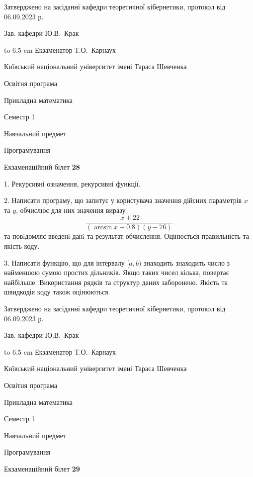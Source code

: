 \documentclass[12pt, ukrainian]{article}
\begin{document}
{\smallskip\smallskip \begin {scriptsize} Затверджено на засіданні кафедри теоретичної кібернетики, протокол   від   06.09.2023 р.\par\smallskip\smallskip\smallskip\smallskip
{\parbox {6.5 cm} {Зав. кафедри \dotfill Ю.В.~Крак}}\hspace {0.7cm} {\hbox to 6.5 cm { Екзаменатор \dotfill Т.О.~Карнаух}} \end{scriptsize}}
\newpage
{{\begin {scriptsize}\par
{ \center  Київський національний університет імені Тараса Шевченка \par}
{\parbox {5 cm}{Освітня програма \hfill}{\parbox {7 cm}{Прикладна математика\hfill}}\parbox {6 cm}{\hfill Семестр 1}}\par
{\parbox {5 cm} {Навчальний предмет \hfill}\parbox {7 cm}{Програмування \hfill}\parbox {6cm}{\hfill}\par}\vspace{-15pt} \end{scriptsize}}{\center Екзаменаційний білет \No \textbf { 28 }\par}}
{%
1. Рекурсивні означення, рекурсивні функції.%
\par
2. Написати програму, що запитує у користувача значення дійсних параметрів $x$ та $y$, обчислює для них значення виразу 
$$\frac{\ x + 22}{(\arcsin x + 0.8) (y - 76)}$$ 
та повiдомляє введенi данi та результат обчислення.
 Оцінюється правильність та якість коду.

\par
3. Написати функцію, що для інтервалу $[a, b)$ знаходить знаходить число з найменшою сумою простих дільників. Якщо таких чисел кілька, повертає найбільше.  Використання рядків та структур даних заборонено. Якість та швидкодія коду також оцінюються. 

}
{\smallskip\smallskip \begin {scriptsize} Затверджено на засіданні кафедри теоретичної кібернетики, протокол   від   06.09.2023 р.\par\smallskip\smallskip\smallskip\smallskip
{\parbox {6.5 cm} {Зав. кафедри \dotfill Ю.В.~Крак}}\hspace {0.7cm} {\hbox to 6.5 cm { Екзаменатор \dotfill Т.О.~Карнаух}} \end{scriptsize}}
\vspace{0.9cm}
{{\begin {scriptsize}\par
{ \center  Київський національний університет імені Тараса Шевченка \par}
{\parbox {5 cm}{Освітня програма \hfill}{\parbox {7 cm}{Прикладна математика\hfill}}\parbox {6 cm}{\hfill Семестр 1}}\par
{\parbox {5 cm} {Навчальний предмет \hfill}\parbox {7 cm}{Програмування \hfill}\parbox {6cm}{\hfill}\par}\vspace{-15pt} \end{scriptsize}}{\center Екзаменаційний білет \No \textbf { 29 }\par}}
\end{document}
